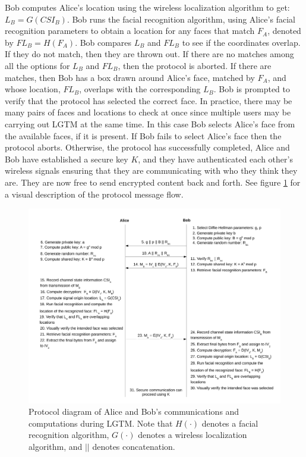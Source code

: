 \documentclass[12pt]{report}
\begin{document}
Bob computes Alice's location using the wireless localization algorithm to get: $L_{B} = G(CSI_{B})$. Bob runs the facial recognition algorithm, using Alice's facial recognition parameters to obtain a location for any faces that match $F_{A}$, denoted by $FL_{B} = H(F_{A})$. Bob compares $L_{B}$ and $FL_{B}$ to see if the coordinates overlap. If they do not match, then they are thrown out. If there are no matches among all the options for $L_{B}$ and $FL_{B}$, then the protocol is aborted. If there are matches, then Bob has a box drawn around Alice's face, matched by $F_{A}$, and whose location, $FL_{B}$, overlaps with the corresponding $L_{B}$. Bob is prompted to verify that the protocol has selected the correct face. In practice, there may be many pairs of faces and locations to check at once since multiple users may be carrying out LGTM at the same time. In this case Bob selects Alice's face from the available faces, if it is present. If Bob fails to select Alice's face then the protocol aborts. Otherwise, the protocol has successfully completed, Alice and Bob have established a secure key $K$, and they have authenticated each other's wireless signals ensuring that they are communicating with who they think they are. They are now free to send encrypted content back and forth. See figure \ref{figure: protocol-diagram} for a visual description of the protocol message flow. \par

\begin{figure}[!h]
    \begin{center}
        \includegraphics[scale=0.4]{../figures/looks-good-to-me-protocol-diagram--wide.pdf}
        \caption{Protocol diagram of Alice and Bob's communications and computations during LGTM. Note that $H(\cdot)$ denotes a facial recognition algorithm, $G(\cdot)$ denotes a wireless localization algorithm, and $||$ denotes concatenation.}
        \label{figure: protocol-diagram}
    \end{center}
\end{figure}
\end{document}
